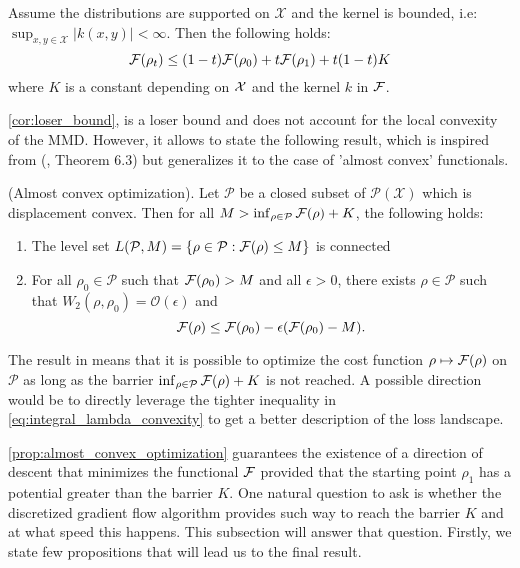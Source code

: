 \begin{corollary}
\label{cor:loser_bound}Assume the distributions are supported on
$\mathcal{X}$ and the kernel is bounded, i.e: $\sup_{x,y\in\mathcal{X}}\vert k(x,y)\vert<\infty$.
Then the following holds:
\begin{equation}
{{\mathcal F}}(\rho_{t})\leq(1-t){{\mathcal F}}(\rho_{0})+t{{\mathcal F}}(\rho_{1})+t(1-t)K
\end{equation}
where $K$ is a constant depending on ${{\mathcal X}}$ and the kernel $k$ in ${{\mathcal F}}$.
\end{corollary}
%
%
\cref{cor:loser_bound}, is a loser bound and does not account for the local
convexity of the MMD. However, it allows to state the following result,
which is inspired from (\cite{Bottou:2017}, Theorem 6.3) but generalizes
it to the case of 'almost convex' functionals.
\begin{proposition}
\label{prop:almost_convex_optimization}
(Almost convex optimization). Let $\mathcal{P}$ be a closed subset
of $\mathcal{P}(\mathcal{X})$ which is displacement convex. Then
for all $M>\inf_{\rho\in\mathcal{P}}{{\mathcal F}}(\rho)+K$, the following
holds:
\end{proposition}
\begin{enumerate}
\item The level set $L(\mathcal{P},M)=\{\rho\in\mathcal{P}:{{\mathcal F}}(\rho)\leq M\}$
is connected
\item For all $\rho_{0}\in\mathcal{P}$ such that ${{\mathcal F}}(\rho_0)>M$
and all $\epsilon>0$, there exists $\rho\in\mathcal{P}$ such that
$W_{2}(\rho,\rho_{0})=\mathcal{O}(\epsilon)$ and
\[
{{\mathcal F}}(\rho)\leq {{\mathcal F}}(\rho_{0})-\epsilon({{\mathcal F}}(\rho_{0})-M).
\]
\end{enumerate}
%
The result in  means that it is possible to optimize the cost function $\rho\mapsto {{\mathcal F}}(\rho)$
on $\mathcal{P}$ as long as the barrier $\inf_{\rho\in\mathcal{P}}{{\mathcal F}}(\rho)+K$
is not reached. A possible direction would be to directly leverage the tighter inequality in \cref{eq:integral_lambda_convexity} to get a better description of the loss landscape.%

\cref{prop:almost_convex_optimization} guarantees the existence of a direction of descent that minimizes the functional ${{\mathcal F}}$ provided that the starting point $\rho_1$ has a potential greater than the barrier $K$.%
One natural question to ask is whether the  discretized gradient flow algorithm provides such way to reach the barrier $K$ and at what speed this happens. This subsection will answer that question. Firstly, we state few propositions that will lead us to the final result.


